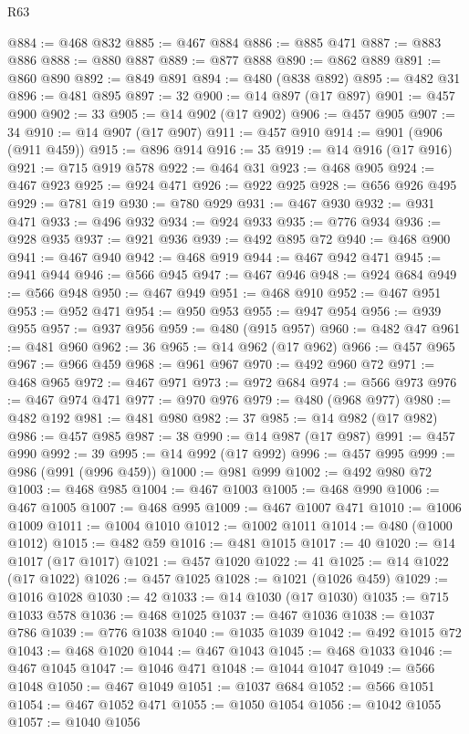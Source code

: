 \begin{lexlean}{R63}
\begin{coremodule}
@884 := @468 @832
@885 := @467 @884
@886 := @885 @471
@887 := @883 @886
@888 := @880 @887
@889 := @877 @888
@890 := @862 @889
@891 := @860 @890
@892 := @849 @891
@894 := @480 (@838 @892)
@895 := @482 @31
@896 := @481 @895
@897 := 32
@900 := @14 @897 (@17 @897)
@901 := @457 @900
@902 := 33
@905 := @14 @902 (@17 @902)
@906 := @457 @905
@907 := 34
@910 := @14 @907 (@17 @907)
@911 := @457 @910
@914 := @901 (@906 (@911 @459))
@915 := @896 @914
@916 := 35
@919 := @14 @916 (@17 @916)
@921 := @715 @919 @578
@922 := @464 @31
@923 := @468 @905
@924 := @467 @923
@925 := @924 @471
@926 := @922 @925
@928 := @656 @926 @495
@929 := @781 @19
@930 := @780 @929
@931 := @467 @930
@932 := @931 @471
@933 := @496 @932
@934 := @924 @933
@935 := @776 @934
@936 := @928 @935
@937 := @921 @936
@939 := @492 @895 @72
@940 := @468 @900
@941 := @467 @940
@942 := @468 @919
@944 := @467 @942 @471
@945 := @941 @944
@946 := @566 @945
@947 := @467 @946
@948 := @924 @684
@949 := @566 @948
@950 := @467 @949
@951 := @468 @910
@952 := @467 @951
@953 := @952 @471
@954 := @950 @953
@955 := @947 @954
@956 := @939 @955
@957 := @937 @956
@959 := @480 (@915 @957)
@960 := @482 @47
@961 := @481 @960
@962 := 36
@965 := @14 @962 (@17 @962)
@966 := @457 @965
@967 := @966 @459
@968 := @961 @967
@970 := @492 @960 @72
@971 := @468 @965
@972 := @467 @971
@973 := @972 @684
@974 := @566 @973
@976 := @467 @974 @471
@977 := @970 @976
@979 := @480 (@968 @977)
@980 := @482 @192
@981 := @481 @980
@982 := 37
@985 := @14 @982 (@17 @982)
@986 := @457 @985
@987 := 38
@990 := @14 @987 (@17 @987)
@991 := @457 @990
@992 := 39
@995 := @14 @992 (@17 @992)
@996 := @457 @995
@999 := @986 (@991 (@996 @459))
@1000 := @981 @999
@1002 := @492 @980 @72
@1003 := @468 @985
@1004 := @467 @1003
@1005 := @468 @990
@1006 := @467 @1005
@1007 := @468 @995
@1009 := @467 @1007 @471
@1010 := @1006 @1009
@1011 := @1004 @1010
@1012 := @1002 @1011
@1014 := @480 (@1000 @1012)
@1015 := @482 @59
@1016 := @481 @1015
@1017 := 40
@1020 := @14 @1017 (@17 @1017)
@1021 := @457 @1020
@1022 := 41
@1025 := @14 @1022 (@17 @1022)
@1026 := @457 @1025
@1028 := @1021 (@1026 @459)
@1029 := @1016 @1028
@1030 := 42
@1033 := @14 @1030 (@17 @1030)
@1035 := @715 @1033 @578
@1036 := @468 @1025
@1037 := @467 @1036
@1038 := @1037 @786
@1039 := @776 @1038
@1040 := @1035 @1039
@1042 := @492 @1015 @72
@1043 := @468 @1020
@1044 := @467 @1043
@1045 := @468 @1033
@1046 := @467 @1045
@1047 := @1046 @471
@1048 := @1044 @1047
@1049 := @566 @1048
@1050 := @467 @1049
@1051 := @1037 @684
@1052 := @566 @1051
@1054 := @467 @1052 @471
@1055 := @1050 @1054
@1056 := @1042 @1055
@1057 := @1040 @1056

\end{coremodule}
\end{lexlean}
